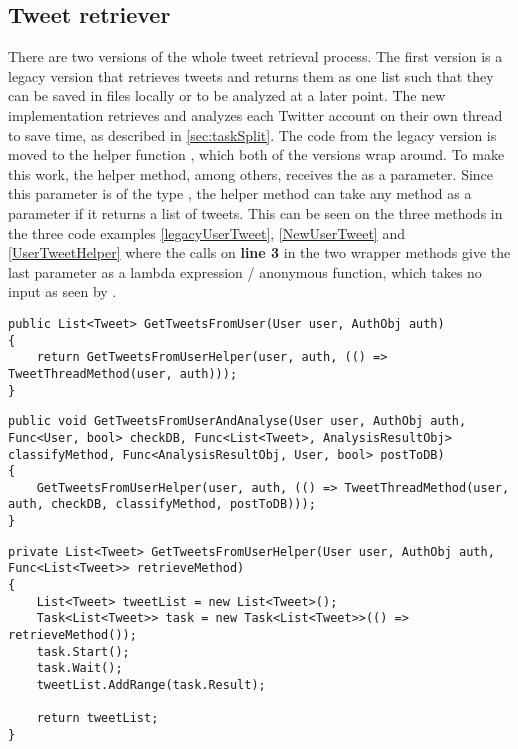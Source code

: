 \subsection{Tweet retriever} \label{sub:tweetretriever}
There are two versions of the whole tweet retrieval process. The first version
is a legacy version that retrieves tweets and returns them as one list such that
they can be saved in files locally or to be analyzed at a later point.
The new implementation retrieves and analyzes each Twitter account on their own
thread to save time, as described in \autoref{sec:taskSplit}. The code from the
legacy version is moved to the helper function ,
which both of the versions wrap around. To make this work, the helper method,
among others, receives the  as a parameter. Since this
parameter is of the type , the helper method can take
any method as a parameter if it returns a list of tweets. This can be
seen on the three methods in the three code examples \autoref{legacyUserTweet},
\autoref{NewUserTweet} and \autoref{UserTweetHelper} where the calls on
\textbf{line 3} in the two wrapper methods give the last parameter as a lambda
expression / anonymous function, which takes no input as seen by \textc{()=>}.\\

\begin{minipage}[H]{\linewidth}
\begin{lstlisting}[caption = Legacy method call. , label = legacyUserTweet ] 
public List<Tweet> GetTweetsFromUser(User user, AuthObj auth)
{	
    return GetTweetsFromUserHelper(user, auth, (() => TweetThreadMethod(user, auth)));
}
\end{lstlisting}
\end{minipage}

\begin{minipage}[H]{\linewidth}
\begin{lstlisting}[caption = Current method call to speed up execution. , label
= NewUserTweet ] 
public void GetTweetsFromUserAndAnalyse(User user, AuthObj auth, Func<User, bool> checkDB, Func<List<Tweet>, AnalysisResultObj> classifyMethod, Func<AnalysisResultObj, User, bool> postToDB)
{
    GetTweetsFromUserHelper(user, auth, (() => TweetThreadMethod(user, auth, checkDB, classifyMethod, postToDB)));
}
\end{lstlisting}
\end{minipage}

\begin{minipage}[H]{\linewidth}
\begin{lstlisting}[caption = The GetTweetsFromUserHelper., label =
UserTweetHelper]
private List<Tweet> GetTweetsFromUserHelper(User user, AuthObj auth, Func<List<Tweet>> retrieveMethod)
{
    List<Tweet> tweetList = new List<Tweet>();
    Task<List<Tweet>> task = new Task<List<Tweet>>(() => retrieveMethod());
    task.Start();
    task.Wait();
    tweetList.AddRange(task.Result);

    return tweetList;
}
\end{lstlisting}
\end{minipage}

